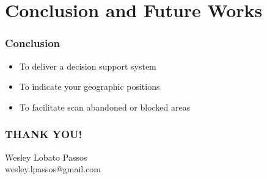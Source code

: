 \documentclass{beamer}
\begin{document}
	\section{Conclusion and Future Works}

		\begin{frame}
			\frametitle{Conclusion}
			\begin{itemize}
				\item To deliver a decision support system
				\item To indicate your geographic positions
				\item To facilitate scan abandoned or blocked areas
			\end{itemize}
		\end{frame}

		\begin{frame}
			\frametitle{THANK YOU!}
			\centering
			Wesley Lobato Passos\\
			wesley.lpassos@gmail.com
		\end{frame}
\end{document}

